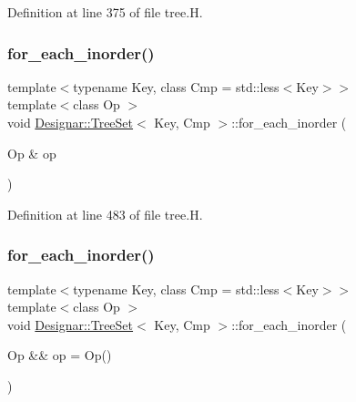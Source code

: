Definition at line 375 of file tree.\+H.

\mbox{\label{class_designar_1_1_tree_set_af57ef3d8bb57487085079df5b5da4139}} 
\subsubsection{\texorpdfstring{for\+\_\+each\+\_\+inorder()}{for\_each\_inorder()}\hspace{0.1cm}{\footnotesize\ttfamily [1/2]}}
{\footnotesize\ttfamily template$<$typename Key, class Cmp = std\+::less$<$\+Key$>$$>$ \\
template$<$class Op $>$ \\
void \hyperlink{class_designar_1_1_tree_set}{Designar\+::\+Tree\+Set}$<$ Key, Cmp $>$\+::for\+\_\+each\+\_\+inorder (\begin{DoxyParamCaption}\item[{Op \&}]{op }\end{DoxyParamCaption})\hspace{0.3cm}{\ttfamily [inline]}}



Definition at line 483 of file tree.\+H.

\mbox{\label{class_designar_1_1_tree_set_a0b3e506271289cc4e1e1fa3ce3ae9113}} 
\subsubsection{\texorpdfstring{for\+\_\+each\+\_\+inorder()}{for\_each\_inorder()}\hspace{0.1cm}{\footnotesize\ttfamily [2/2]}}
{\footnotesize\ttfamily template$<$typename Key, class Cmp = std\+::less$<$\+Key$>$$>$ \\
template$<$class Op $>$ \\
void \hyperlink{class_designar_1_1_tree_set}{Designar\+::\+Tree\+Set}$<$ Key, Cmp $>$\+::for\+\_\+each\+\_\+inorder (\begin{DoxyParamCaption}\item[{Op \&\&}]{op = {\ttfamily Op()} }\end{DoxyParamCaption})\hspace{0.3cm}{\ttfamily [inline]}}



